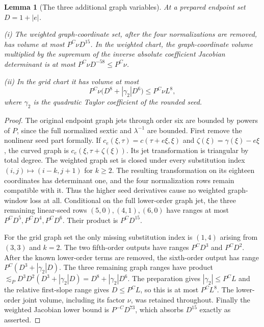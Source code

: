 \documentclass[11pt]{amsart}
\newtheorem{lemma}[theorem]{Lemma}
\theoremstyle{definition}
\theoremstyle{remark}
\numberwithin{equation}{section}
\begin{document}
\begin{lemma}[The three additional graph variables]\label{low:6:so36:graph-windows}
At a prepared endpoint set $D=1+|e|$.

\noindent\textup{(i)} The weighted graph-coordinate set, after the four normalizations are removed, has volume at most $P^C\nu D^{15}$. In the weighted chart, the graph-coordinate volume multiplied by the supremum of the inverse absolute coefficient Jacobian determinant is at most $P^C\nu D^{-58}\le P^C\nu$.

\noindent\textup{(ii)} In the grid chart it has volume at most
\[
P^C\nu\bigl(D^8+|\gamma_2|D^6\bigr)\le P^C\nu L^8,
\]
where $\gamma_2$ is the quadratic Taylor coefficient of the rounded seed.
\end{lemma}
\begin{proof}
The original endpoint graph jets through order six are bounded by powers of $P$, since the full normalized sextic and $\lambda^{-1}$ are bounded. First remove the nonlinear seed part formally. If $c_e(\xi,\tau)=c(\tau+e\xi,\xi)$ and $\zeta(\xi)=\gamma(\xi)-e\xi$, the curved graph is $c_e(\xi,\tau+\zeta(\xi))$. Its jet transformation is triangular by total degree. The weighted graph set is closed under every substitution index $(i,j)\mapsto(i-k,j+1)$ for $k\ge2$. The resulting transformation on its eighteen coordinates has determinant one, and the four normalization rows remain compatible with it. Thus the higher seed derivatives cause no weighted graph-window loss at all. Conditional on the full lower-order graph jet, the three remaining linear-seed rows $(5,0),(4,1),(6,0)$ have ranges at most $P^CD^5,P^CD^4,P^CD^6$. Their product is $P^CD^{15}$.

For the grid graph set the only missing substitution index is $(1,4)$ arising from $(3,3)$ and $k=2$. The two fifth-order outputs have ranges $P^CD^3$ and $P^CD^2$. After the known lower-order terms are removed, the sixth-order output has range $P^C(D^3+|\gamma_2|D)$. The three remaining graph ranges have product $\lesssim_P D^3D^2(D^3+|\gamma_2|D)=D^8+|\gamma_2|D^6$. The preparation gives $|\gamma_2|\le P^CL$ and the relative first-slope range gives $D\le P^CL$, so this is at most $P^CL^8$. The lower-order joint volume, including its factor $\nu$, was retained throughout. Finally the weighted Jacobian lower bound is $P^{-C}D^{73}$, which absorbs $D^{15}$ exactly as asserted.
\end{proof}
\end{document}
